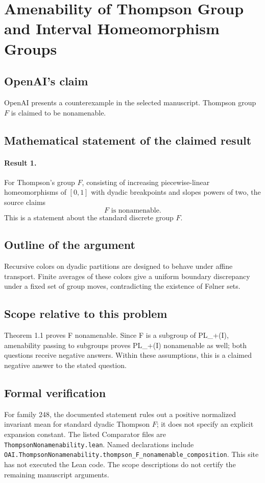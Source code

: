 \documentclass[11pt]{article}
\begin{document}
\section*{Amenability of Thompson Group and Interval Homeomorphism Groups}

\subsection{OpenAI's claim}
OpenAI presents a counterexample in the selected manuscript. Thompson group $F$ is claimed to be nonamenable.

\subsection{Mathematical statement of the claimed result}
\paragraph{Result 1.} For Thompson's group \(F\), consisting of increasing piecewise-linear homeomorphisms of \([0,1]\) with dyadic breakpoints and slopes powers of two, the source claims
\[
 F\text{ is nonamenable}.
\]
This is a statement about the standard discrete group \(F\).

\subsection{Outline of the argument}
Recursive colors on dyadic partitions are designed to behave under affine transport. Finite averages of these colors give a uniform boundary discrepancy under a fixed set of group moves, contradicting the existence of Følner sets.

\subsection{Scope relative to this problem}
Theorem 1.1 proves F nonamenable. Since F is a subgroup of PL\_+(I), amenability passing to subgroups proves PL\_+(I) nonamenable as well; both questions receive negative answers. Within these assumptions, this is a claimed negative answer to the stated question.

\subsection{Formal verification}
For family 248, the documented statement rules out a positive normalized invariant mean for standard dyadic Thompson $F$; it does not specify an explicit expansion constant. The listed Comparator files are \texttt{ThompsonNonamenability.lean}. Named declarations include \texttt{OAI.ThompsonNonamenability.thompson\_F\_nonamenable\_composition}. This site has not executed the Lean code. The scope descriptions do not certify the remaining manuscript arguments.
\end{document}
